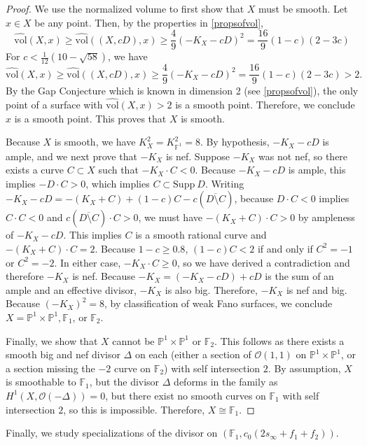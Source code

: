 \documentclass[11pt]{amsart}
\numberwithin{equation}{section}
\theoremstyle{definition}
\newcommand{\bF}{\mathbb{F}}
\newcommand{\bP}{\mathbb{P}}
\newcommand{\calO}{\mathcal{O}}
\newcommand{\Supp}{\textrm{Supp}}
\newcommand{\vol}{\mathrm{vol}}
\begin{document}
\begin{proof}
    We use the normalized volume to first show that $X$ must be smooth.  Let $x \in X$ be any point.  Then, by the properties in \ref{propsofvol},
    \[ \widehat{\vol}(X,x) \ge \widehat{\vol}((X,cD),x) \ge \frac{4}{9} (-K_X - cD)^2 = \frac{16}{9}(1-c)(2-3c) \] For  $c < \frac{1}{12}(10 - \sqrt{58})$, we have 
    \[ \widehat{\vol}(X,x) \ge \widehat{\vol}((X,cD),x) \ge \frac{4}{9} (-K_X - cD)^2 = \frac{16}{9}(1-c)(2-3c) > 2. \] 
    By the Gap Conjecture which is known in dimension 2 (see \ref{propsofvol}), the only point of a surface with $\widehat{\vol}(X,x) > 2$ is a smooth point.  Therefore, we conclude $x$ is a smooth point. This proves that $X$ is smooth. 

    Because $X$ is smooth, we have $K_X^2 = K_{\bF^1}^2 = 8$.  By hypothesis, $-K_X - cD$ is ample, and we next prove that $-K_X$ is nef.  Suppose $-K_X$ was not nef, so there exists a curve $C \subset X$ such that $-K_X \cdot C < 0$.  Because $-K_X - cD$ is ample, this implies $-D \cdot C > 0$, which implies $C \subset \Supp \ D$.  Writing 
    $-K_X - cD = -(K_X + C) + (1-c)C - c(\overline{D \setminus C})$, because $D \cdot C < 0$ implies $C \cdot C < 0$ and $c(\overline{D \setminus C}) \cdot C > 0$, we must have $-(K_X + C) \cdot C > 0$ by ampleness of $-K_X - cD$.  This implies $C$ is a smooth rational curve and $-(K_X + C) \cdot C = 2$.  Because $1-c \ge 0.8$, $(1-c) C < 2$ if and only if $C^2 = -1$ or $C^2 = -2$.  In either case, $-K_X \cdot C \ge 0$, so we have derived a contradiction and therefore $-K_X$ is nef.  Because $-K_X = (-K_X - cD) + cD$ is the sum of an ample and an effective divisor, $-K_X$ is also big.  Therefore, $-K_X$ is nef and big.  Because $(-K_X)^2 = 8$, by classification of weak Fano surfaces, we conclude $X = \bP^1 \times \bP^1, \bF_1$, or $\bF_2$.  

    Finally, we show that $X$ cannot be $\bP^1 \times \bP^1$ or $\bF_2$.  This follows as there exists a smooth big and nef divisor $\Delta$ on each (either a section of $\calO(1,1)$ on $\bP^1 \times \bP^1$, or a section missing the $-2$ curve on $\bF_2$) with self intersection $2$.  By assumption, $X$ is smoothable to $\bF_1$, but the divisor $\Delta$ deforms in the family as $H^1(X, \calO(-\Delta)) = 0$, but there exist no smooth curves on $\bF_1$ with self intersection $2$, so this is impossible.  Therefore, $X \cong \bF_1$. 
\end{proof}

Finally, we study specializations of the divisor on $(\bF_1, c_0(2s_\infty + f_1 + f_2))$.
\end{document}
